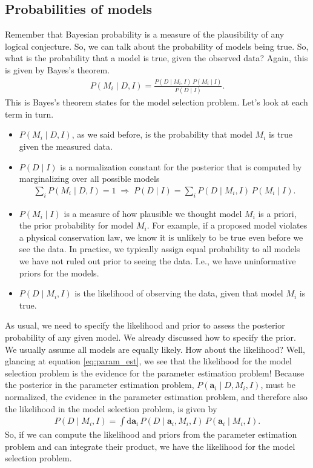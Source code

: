 \subsection{Probabilities of models}
Remember that Bayesian probability is a measure of the plausibility of
any logical conjecture.  So, we can talk about the probability of
models being true.  So, what is the probability that a model is true,
given the observed data?  Again, this is given by Bayes's theorem.
\begin{align}
P(M_i\mid D, I) = \frac{P(D\mid M_i, I)\,P(M_i\mid I)}{P(D\mid I)}.
\label{eq:model_selection_bayes}
\end{align}
This is Bayes's theorem states for the model selection problem.  Let's
look at each term in turn.
\begin{itemize}
\item $P(M_i\mid D, I)$, as we said before, is the probability that
  model $M_i$ is true given the measured data.
\item $P(D\mid I)$ is a normalization constant for the posterior that
  is computed by marginalizing over all possible models
  \begin{align}
    \sum_i P(M_i\mid D, I) = 1\;\Rightarrow\;
    P(D\mid I) = \sum_i P(D\mid M_i, I)\,P(M_i\mid I).
  \end{align}
\item $P(M_i \mid I)$ is a measure of how plausible we thought model $M_i$ is a priori,
  the prior probability for model $M_i$.  For example, if a proposed
  model violates a physical conservation law, we know it is unlikely
  to be true even before we see the data.  In practice, we typically assign
  equal probability to all models we have not ruled out prior to seeing
  the data.  I.e., we have uninformative priors for the models.
\item $P(D\mid M_i, I)$ is the likelihood of observing the data, given
  that model $M_i$ is true.
\end{itemize}

As usual, we need to specify the likelihood and prior to assess the
posterior probability of any given model.  We already discussed how to
specify the prior.  We usually assume all models are equally likely.
How about the likelihood?  Well, glancing at equation
\eqref{eq:param_est}, we see that the likelihood for the model
selection problem is the evidence for the parameter estimation
problem!  Because the posterior in the parameter estimation problem,
$P(\mathbf{a}_i\mid D, M_i, I)$, must be normalized, the evidence in
the parameter estimation problem, and therefore also the likelihood in the
model selection problem, is given by
\begin{align}
P(D\mid M_i, I) = \int \mathrm{d}\mathbf{a}_i\,P(D\mid \mathbf{a}_i, M_i, I)\,
P(\mathbf{a}_i\mid M_i, I).
\label{eq:bayes_factor_integral}
\end{align}
So, if we can compute the likelihood and priors from the parameter
estimation problem and can integrate their product, we have the
likelihood for the model selection problem.


